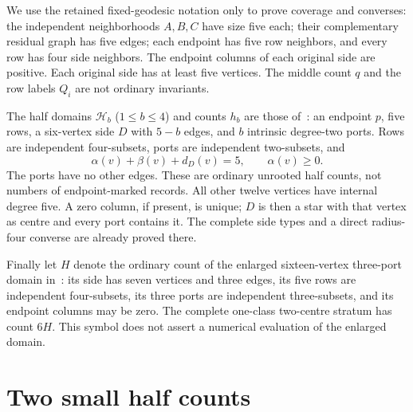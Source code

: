 \documentclass[11pt]{article}
\begin{document}
We use the retained fixed-geodesic notation only to prove coverage and
converses: the independent neighborhoods $A,B,C$ have size five each;
their complementary residual graph has five edges; each endpoint has
five row neighbors, and every row has four side neighbors. The endpoint
columns of each original side are positive. Each original side has at
least five vertices. The middle count $q$ and the row labels $Q_i$ are
not ordinary invariants.

The half domains $\mathcal H_b$ ($1\leq b\leq4$) and counts $h_b$ are
those of~\cite{halves}: an endpoint $p$, five rows, a six-vertex side
$D$ with $5-b$ edges, and $b$ intrinsic degree-two ports. Rows are
independent four-subsets, ports are independent two-subsets, and
\[
 \alpha(v)+\beta(v)+d_D(v)=5,\qquad \alpha(v)\geq0.
\]
The ports have no other edges. These are ordinary unrooted half counts,
not numbers of endpoint-marked records. All other twelve vertices have
internal degree five. A zero column, if present, is unique; $D$ is then
a star with that vertex as centre and every port contains it. The complete
side types and a direct radius-four converse are already proved there.

Finally let $H$ denote the ordinary count of the enlarged sixteen-vertex
three-port domain in~\cite{centre}: its side has seven vertices and three
edges, its five rows are independent four-subsets, its three ports are
independent three-subsets, and its endpoint columns may be zero. The
complete one-class two-centre stratum has count $6H$. This symbol does
not assert a numerical evaluation of the enlarged domain.

\section{Two small half counts}
\end{document}
